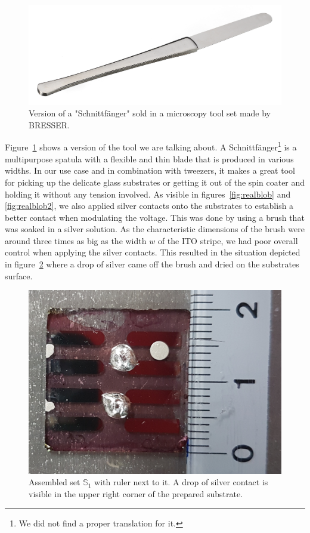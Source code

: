 \begin{figure}[h]\centering
\includegraphics[width=\columnwidth]{../n-1_Pictures/Schnittfaenger.png}
\caption{Version of a "Schnittfänger" sold in a microscopy tool set made by BRESSER.}
\label{fig:cutcatcher}
\end{figure}
Figure~\ref{fig:cutcatcher} shows a version of the tool we are talking about. A Schnittfänger\footnote{We did not find a proper translation for it.} is a multipurpose spatula with a flexible and thin blade that is produced in various widths. In our use case and in combination with tweezers, it makes a great tool for picking up the delicate glass substrates or getting it out of the spin coater and holding it without any tension involved.\mypar
As visible in figures~\ref{fig:realblob} and \ref{fig:realblob2}, we also applied silver contacts onto the substrates to establish a better contact when modulating the voltage. This was done by using a brush that was soaked in a silver solution. As the characteristic dimensions of the brush were around three times as big as the width $w$ of the ITO stripe, we had poor overall control when applying the silver contacts. This resulted in the situation depicted in figure~\ref{fig:realblob3} where a drop of silver came off the brush and dried on the substrates surface.

\begin{figure}[h]\centering
\includegraphics[width=0.9\columnwidth]{../n-1_Pictures/cell1.png}
\caption{Assembled set $\mathbb{S}_1$ with ruler next to it. A drop of silver contact is visible in the upper right corner of the prepared substrate.}
\label{fig:realblob3}
\end{figure}


